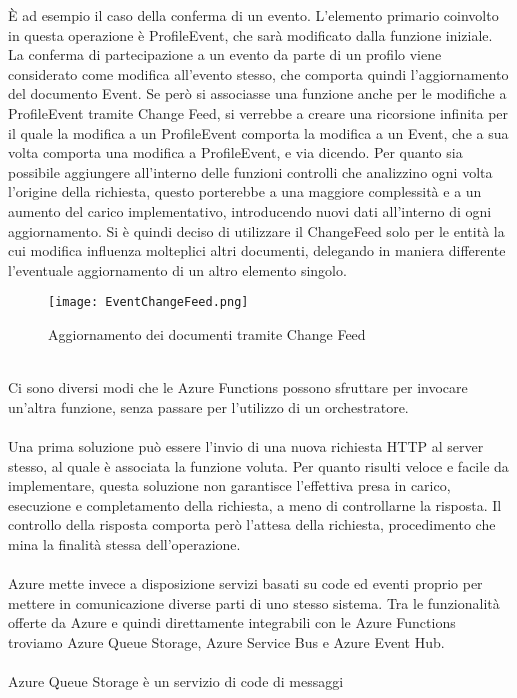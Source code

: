 È ad esempio il caso della conferma di un evento.
L'elemento primario coinvolto in questa operazione è ProfileEvent,
che sarà modificato dalla funzione iniziale.
La conferma di partecipazione a un evento da parte di un profilo
viene considerato come modifica all'evento stesso,
che comporta quindi l'aggiornamento del documento Event.
Se però si associasse una funzione anche per le modifiche a ProfileEvent tramite Change Feed,
si verrebbe a creare una ricorsione infinita per il quale 
la modifica a un ProfileEvent comporta la modifica a un Event, 
che a sua volta comporta una modifica a ProfileEvent, e via dicendo.
Per quanto sia possibile aggiungere all'interno delle funzioni controlli
che analizzino ogni volta l'origine della richiesta,
questo porterebbe a una maggiore complessità e a un aumento del carico implementativo,
introducendo nuovi dati all'interno di ogni aggiornamento.
Si è quindi deciso di utilizzare il ChangeFeed solo per le entità
la cui modifica influenza molteplici altri documenti,
delegando in maniera differente l'eventuale aggiornamento di un altro elemento singolo.\\
\begin{figure}[htbp]
    \centering
    \texttt{[image: EventChangeFeed.png]}
    \caption{Aggiornamento dei documenti tramite Change Feed}
\end{figure}\\
Ci sono diversi modi che le Azure Functions possono sfruttare
per invocare un'altra funzione, senza passare per l'utilizzo di un orchestratore.\\
\\
Una prima soluzione può essere l'invio di una nuova richiesta HTTP al server stesso,
al quale è associata la funzione voluta.
Per quanto risulti veloce e facile da implementare,
questa soluzione non garantisce l'effettiva presa in carico, esecuzione e completamento della richiesta,
a meno di controllarne la risposta.
Il controllo della risposta comporta però l'attesa della richiesta,
procedimento che mina la finalità stessa dell'operazione.\\
\\
Azure mette invece a disposizione servizi basati su code ed eventi
proprio per mettere in comunicazione diverse parti di uno stesso sistema.
Tra le funzionalità offerte da Azure e
quindi direttamente integrabili con le Azure Functions troviamo
Azure Queue Storage, Azure Service Bus e Azure Event Hub.\\
\\
Azure Queue Storage è un servizio di code di messaggi
